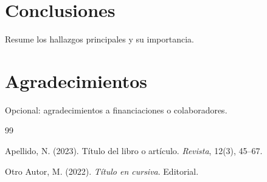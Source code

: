 \documentclass[12pt,a4paper]{article}
\theoremstyle{definition}
\theoremstyle{theorem}
\begin{document}
\section{Conclusiones}

Resume los hallazgos principales y su importancia.

\section*{Agradecimientos}

Opcional: agradecimientos a financiaciones o colaboradores.

\begin{thebibliography}{99}

Apellido, N. (2023).
\newblock Título del libro o artículo.
\newblock \textit{Revista}, 12(3), 45--67.

Otro Autor, M. (2022).
\newblock \textit{Título en cursiva}.
\newblock Editorial.

\end{thebibliography}

% 
% 
\end{document}

